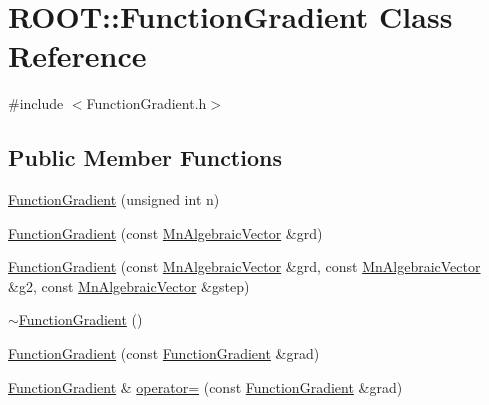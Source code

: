 \hypertarget{classROOT_1_1Minuit2_1_1FunctionGradient}{}\section{R\+O\+OT\+:\+:Function\+Gradient Class Reference}
\label{classROOT_1_1Minuit2_1_1FunctionGradient}


{\ttfamily \#include $<$Function\+Gradient.\+h$>$}

\subsection*{Public Member Functions}
\begin{DoxyCompactItemize}
\item 
\mbox{\hyperlink{classROOT_1_1Minuit2_1_1FunctionGradient_ae2e6c3f8011dbe5aaf75c8e41b7de9b5}{Function\+Gradient}} (unsigned int n)
\item 
\mbox{\hyperlink{classROOT_1_1Minuit2_1_1FunctionGradient_afa8994fbd866150bd14ab53a2919c7bf}{Function\+Gradient}} (const \mbox{\hyperlink{namespaceROOT_1_1Minuit2_a62ed97730a1ca8d3fbaec64a19aa11c9}{Mn\+Algebraic\+Vector}} \&grd)
\item 
\mbox{\hyperlink{classROOT_1_1Minuit2_1_1FunctionGradient_ac9d34f0e3e55ec0e9d5e8a8bd3678b79}{Function\+Gradient}} (const \mbox{\hyperlink{namespaceROOT_1_1Minuit2_a62ed97730a1ca8d3fbaec64a19aa11c9}{Mn\+Algebraic\+Vector}} \&grd, const \mbox{\hyperlink{namespaceROOT_1_1Minuit2_a62ed97730a1ca8d3fbaec64a19aa11c9}{Mn\+Algebraic\+Vector}} \&g2, const \mbox{\hyperlink{namespaceROOT_1_1Minuit2_a62ed97730a1ca8d3fbaec64a19aa11c9}{Mn\+Algebraic\+Vector}} \&gstep)
\item 
\mbox{\hyperlink{classROOT_1_1Minuit2_1_1FunctionGradient_a702df78fcfb1f33625273cb1c9cb1914}{$\sim$\+Function\+Gradient}} ()
\item 
\mbox{\hyperlink{classROOT_1_1Minuit2_1_1FunctionGradient_ad21f4d36683bacc95bf2dfe74fe4d205}{Function\+Gradient}} (const \mbox{\hyperlink{classROOT_1_1Minuit2_1_1FunctionGradient}{Function\+Gradient}} \&grad)
\item 
\mbox{\hyperlink{classROOT_1_1Minuit2_1_1FunctionGradient}{Function\+Gradient}} \& \mbox{\hyperlink{classROOT_1_1Minuit2_1_1FunctionGradient_a0b85ff1f65dbefea4c3953898efb06ec}{operator=}} (const \mbox{\hyperlink{classROOT_1_1Minuit2_1_1FunctionGradient}{Function\+Gradient}} \&grad)
\item 

\end{DoxyCompactItemize}
